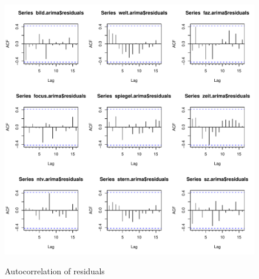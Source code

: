 \documentclass[12pt,a4paper,notitlepage]{article}
\begin{document}
\begin{figure}[H]\centering
\caption{Autocorrelation of residuals}
	\includegraphics[scale=.7]{../figs/acf_news1}
	\label{}
\end{figure}
\end{document}
